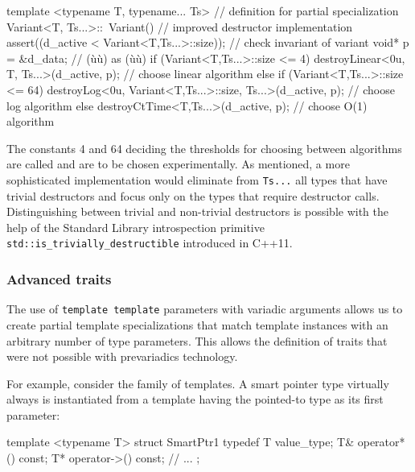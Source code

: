 \begin{emcppslisting}[emcppsbatch=e39]
template <typename T, typename... Ts>  // definition for partial specialization
Variant<T, Ts...>::~Variant()          // improved destructor implementation
{
    assert((d_active < Variant<T,Ts...>::size));   // check invariant of variant
    void* p = &d_data;                             // (ù{}ù) as (ù{}ù)
    if (Variant<T,Ts...>::size <= 4)
        destroyLinear<0u, T, Ts...>(d_active, p);  // choose linear algorithm
    else if (Variant<T,Ts...>::size <= 64)
        destroyLog<0u, Variant<T,Ts...>::size,
                   Ts...>(d_active, p);            // choose log algorithm
    else
        destroyCtTime<T,Ts...>(d_active, p);       // choose O(1) algorithm
}
\end{emcppslisting}
    

\noindent The constants 4 and 64 deciding the thresholds for choosing between
algorithms are called  and are to be chosen
experimentally. As mentioned, a more sophisticated implementation would
eliminate from \lstinline!Ts...! all types that have trivial destructors
and focus only on the types that require destructor calls.
Distinguishing between trivial and non-trivial destructors is possible
with the help of the Standard Library introspection primitive
\lstinline!std::is_trivially_destructible! introduced in C++11.

\subsubsection[Advanced traits]{Advanced traits}\label{advanced-traits}

The use of \lstinline!template!~\lstinline!template! parameters with variadic
arguments allows us to create partial template specializations that
match template instances with an arbitrary number of type parameters.
This allows the definition of traits that were not possible with
prevariadics technology.

For example, consider the family of  templates. A
smart pointer type virtually always is instantiated from a template
having the pointed-to type as its first parameter:

\begin{emcppslisting}[emcppsbatch=e40]
template <typename T>
struct SmartPtr1
{
    typedef T value_type;
    T& operator*() const;
    T* operator->() const;
    // ...
};
\end{emcppslisting}
    

